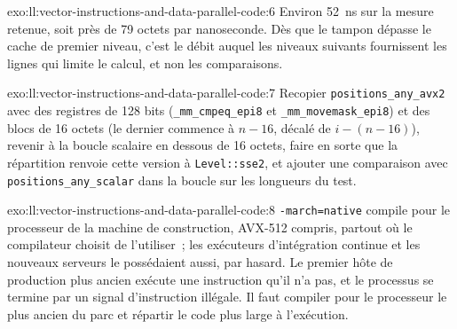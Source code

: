 \begin{solution}{exo:ll:vector-instructions-and-data-parallel-code:6}
Environ \qty{52}{\nano\second} sur la mesure retenue, soit près de 79 octets par nanoseconde. Dès que le tampon dépasse le cache de premier niveau,
c'est le débit auquel les niveaux suivants fournissent les lignes qui limite le calcul, et non les comparaisons.
\end{solution}

\begin{solution}{exo:ll:vector-instructions-and-data-parallel-code:7} \sloppy
Recopier \texttt{positions\_any\_avx2} avec des registres de 128 bits (\texttt{\_mm\_cmpeq\_epi8} et
\texttt{\_mm\_movemask\_epi8}) et des blocs de 16 octets (le dernier commence à $n - 16$, décalé de $i - (n - 16)$), revenir à la boucle scalaire
en dessous de 16 octets, faire en sorte que la répartition renvoie cette version à \texttt{Level::sse2}, et ajouter une comparaison avec
\texttt{positions\_any\_scalar} dans la boucle sur les longueurs du test.
\end{solution}

\begin{solution}{exo:ll:vector-instructions-and-data-parallel-code:8}
\texttt{-march=native} compile pour le processeur de la machine de construction, AVX-512 compris, partout où le compilateur choisit de l'utiliser~;
les exécuteurs d'intégration continue et les nouveaux serveurs le possédaient aussi, par hasard. Le premier hôte de production plus ancien exécute
une instruction qu'il n'a pas, et le processus se termine par un signal d'instruction illégale. Il faut compiler pour le processeur le plus ancien
du parc et répartir le code plus large à l'exécution.
\end{solution}

